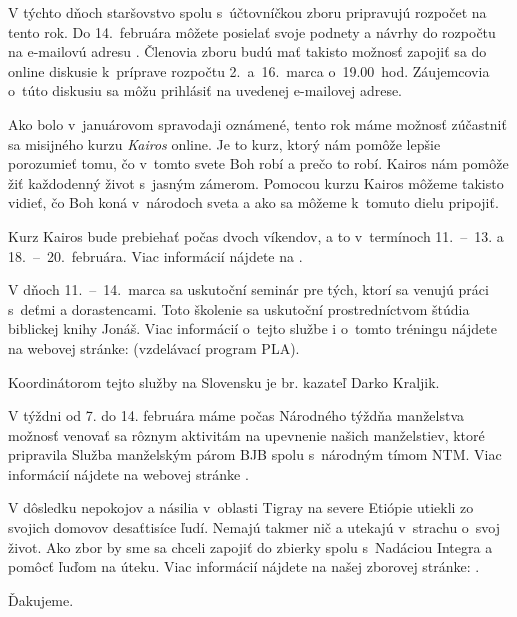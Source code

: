 V týchto dňoch staršovstvo spolu s~účtovníčkou zboru pripravujú rozpočet na tento rok. Do 14.~februára môžete posielať svoje podnety a návrhy do rozpočtu na e-mailovú adresu . Členovia zboru budú mať takisto možnosť zapojiť sa do online diskusie k~príprave rozpočtu 2.~a~16.~marca o~19.00~hod. Záujemcovia o~túto diskusiu sa môžu prihlásiť na uvedenej e-mailovej adrese.


Ako bolo v~januárovom spravodaji oznámené, tento rok máme možnosť zúčastniť sa misijného kurzu {\it Kairos} online. Je to kurz, ktorý nám pomôže lepšie porozumieť tomu, čo v~tomto svete Boh robí a prečo to robí. Kairos nám pomôže žiť každodenný život s~jasným zámerom. Pomocou kurzu Kairos môžeme takisto vidieť, čo Boh koná v~národoch sveta a ako sa môžeme k~tomuto dielu pripojiť.

Kurz Kairos bude prebiehať počas dvoch víkendov, a to v~termínoch 11.~--~13. a 18.~--~20.~februára. Viac informácií nájdete na .


V dňoch 11.~--~14.~marca sa uskutoční seminár pre tých, ktorí sa venujú práci s~deťmi a dorastencami. Toto školenie sa uskutoční prostredníctvom štúdia biblickej knihy Jonáš. Viac informácií o~tejto službe i o~tomto tréningu nájdete na webovej stránke:  (vzdelávací program PLA).

Koordinátorom tejto služby na Slovensku je br. kazateľ Darko Kraljik.
\vfill\break


V týždni od 7. do 14. februára máme počas Národného týždňa manželstva možnosť venovať sa rôznym aktivitám na upevnenie našich manželstiev, ktoré pripravila Služba manželským párom BJB spolu s~národným tímom NTM. Viac informácií nájdete na webovej stránke .


V dôsledku nepokojov a násilia v~oblasti Tigray na severe Etiópie utiekli zo svojich domovov desaťtisíce ľudí. Nemajú takmer nič a utekajú v~strachu o~svoj život. Ako zbor by sme sa chceli zapojiť do zbierky spolu s~Nadáciou Integra a pomôcť ľuďom na úteku. Viac informácií nájdete na našej zborovej stránke: .

Ďakujeme.


